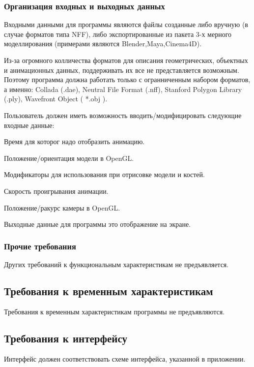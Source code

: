 \subsubsection{Организация входных и выходных данных}
\begin{my_enumerate}
\item Входными данными для программы являются файлы созданные  либо вручную (в случае форматов типа NFF), либо экспортированные из пакета 3-х мерного моделлирования (примерами являются Blender,Maya,Cinema4D).
\item Из-за огромного колличества форматов для описания геометрических, объектных и анимационных данных, поддерживать их все не представляется возможным. Поэтому программа должна работать только с огранниченным набором форматов, а именно: Collada (.dae), Neutral File Format (.nff), Stanford  Polygon Library (.ply), Wavefront Object ( *.obj ).
\item Пользователь должен иметь возможность вводить/модифицировать следующие входные данные:
\begin{my_enumerate}
\item Время для которог надо отобразить анимацию.
\item Положение/ориентация модели в OpenGL.
\item Модификаторы для использования при отрисовке модели и костей.
\item Скорость проигрывания анимации.
\item Положение/ракурс камеры в OpenGL.
\end{my_enumerate}
\item Выходные данные для программы это отображение на экране.
\end{my_enumerate}

\subsubsection{Прочие требования}
Других требований к функциональным характеристикам не предъявляется. 

\subsection{Требования к временным характеристикам}
Требования к временным характеристикам программы не предъявляются.


\subsection{Требования к интерфейсу}
Интерфейс должен соответствовать схеме интерфейса, указанной в приложении.



